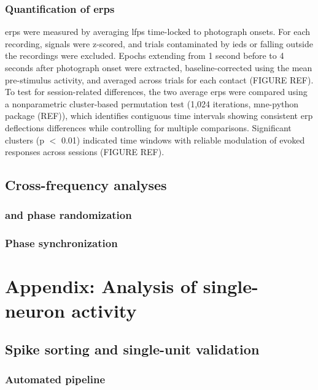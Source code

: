 \documentclass[12pt,a4paper]{report}
\newcommand{\g}[1]{\gls{#1}}     %
\newcommand{\gs}[1]{\glsentryshort{#1}}  %
\newcommand{\gp}[1]{\glspl{#1}}  %
\begin{document}
\subsection{Quantification of \gp{erp}}
\gp{erp} were measured by averaging \gp{lfp} time-locked to photograph onsets. For each recording, signals were z-scored, and trials contaminated by \gp{ied} or falling outside the recordings were excluded. Epochs extending from 1 second before to 4 seconds after photograph onset were extracted, baseline-corrected using the mean pre-stimulus activity, and averaged across trials for each contact (FIGURE REF). To test for session-related differences, the two average \gp{erp} were compared using a nonparametric cluster-based permutation test (1,024 iterations, mne-python package (REF)), which identifies contiguous time intervals showing consistent \g{erp} deflections differences while controlling for multiple comparisons. Significant clusters (p $<$ 0.01) indicated time windows with reliable modulation of evoked responses across sessions (FIGURE REF).

\section{Cross-frequency analyses}
\label{apdx:crossFreq}
\subsection{\gs{pac} and phase randomization}
\subsection{Phase synchronization}
\subsection{\gs{hhsa}}

\chapter{Appendix: Analysis of single-neuron activity}

\section{Spike sorting and single-unit validation}
\label{apdx:spike-sorting}
\subsection{Automated pipeline}
\end{document}
